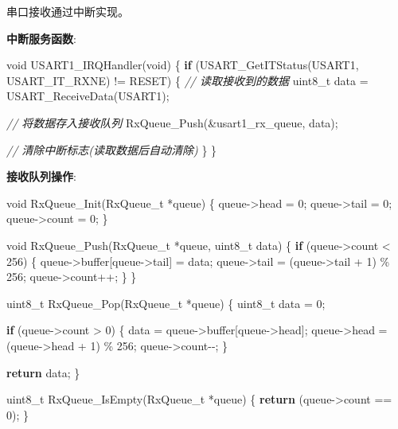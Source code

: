 \documentclass[
]{article}
\newenvironment{Shaded}{}{}
\newcommand{\CommentTok}[1]{\textcolor[rgb]{0.38,0.63,0.69}{\textit{#1}}}
\newcommand{\ControlFlowTok}[1]{\textcolor[rgb]{0.00,0.44,0.13}{\textbf{#1}}}
\newcommand{\DataTypeTok}[1]{\textcolor[rgb]{0.56,0.13,0.00}{#1}}
\newcommand{\DecValTok}[1]{\textcolor[rgb]{0.25,0.63,0.44}{#1}}
\newcommand{\NormalTok}[1]{#1}
\begin{document}
串口接收通过中断实现。

\textbf{中断服务函数}:

\begin{Shaded}
\begin{Highlighting}[]
\DataTypeTok{void}\NormalTok{ USART1\_IRQHandler(}\DataTypeTok{void}\NormalTok{)}
\NormalTok{\{}
    \ControlFlowTok{if}\NormalTok{ (USART\_GetITStatus(USART1, USART\_IT\_RXNE) != RESET) \{}
        \CommentTok{// 读取接收到的数据}
        \DataTypeTok{uint8\_t}\NormalTok{ data = USART\_ReceiveData(USART1);}
        
        \CommentTok{// 将数据存入接收队列}
\NormalTok{        RxQueue\_Push(\&usart1\_rx\_queue, data);}
        
        \CommentTok{// 清除中断标志(读取数据后自动清除)}
\NormalTok{    \}}
\NormalTok{\}}
\end{Highlighting}
\end{Shaded}

\textbf{接收队列操作}:

\begin{Shaded}
\begin{Highlighting}[]
\DataTypeTok{void}\NormalTok{ RxQueue\_Init(RxQueue\_t *queue)}
\NormalTok{\{}
\NormalTok{    queue{-}\textgreater{}head = }\DecValTok{0}\NormalTok{;}
\NormalTok{    queue{-}\textgreater{}tail = }\DecValTok{0}\NormalTok{;}
\NormalTok{    queue{-}\textgreater{}count = }\DecValTok{0}\NormalTok{;}
\NormalTok{\}}

\DataTypeTok{void}\NormalTok{ RxQueue\_Push(RxQueue\_t *queue, }\DataTypeTok{uint8\_t}\NormalTok{ data)}
\NormalTok{\{}
    \ControlFlowTok{if}\NormalTok{ (queue{-}\textgreater{}count \textless{} }\DecValTok{256}\NormalTok{) \{}
\NormalTok{        queue{-}\textgreater{}buffer[queue{-}\textgreater{}tail] = data;}
\NormalTok{        queue{-}\textgreater{}tail = (queue{-}\textgreater{}tail + }\DecValTok{1}\NormalTok{) \% }\DecValTok{256}\NormalTok{;}
\NormalTok{        queue{-}\textgreater{}count++;}
\NormalTok{    \}}
\NormalTok{\}}

\DataTypeTok{uint8\_t}\NormalTok{ RxQueue\_Pop(RxQueue\_t *queue)}
\NormalTok{\{}
    \DataTypeTok{uint8\_t}\NormalTok{ data = }\DecValTok{0}\NormalTok{;}
    
    \ControlFlowTok{if}\NormalTok{ (queue{-}\textgreater{}count \textgreater{} }\DecValTok{0}\NormalTok{) \{}
\NormalTok{        data = queue{-}\textgreater{}buffer[queue{-}\textgreater{}head];}
\NormalTok{        queue{-}\textgreater{}head = (queue{-}\textgreater{}head + }\DecValTok{1}\NormalTok{) \% }\DecValTok{256}\NormalTok{;}
\NormalTok{        queue{-}\textgreater{}count{-}{-};}
\NormalTok{    \}}
    
    \ControlFlowTok{return}\NormalTok{ data;}
\NormalTok{\}}

\DataTypeTok{uint8\_t}\NormalTok{ RxQueue\_IsEmpty(RxQueue\_t *queue)}
\NormalTok{\{}
    \ControlFlowTok{return}\NormalTok{ (queue{-}\textgreater{}count == }\DecValTok{0}\NormalTok{);}
\NormalTok{\}}
\end{Highlighting}
\end{Shaded}
\end{document}
